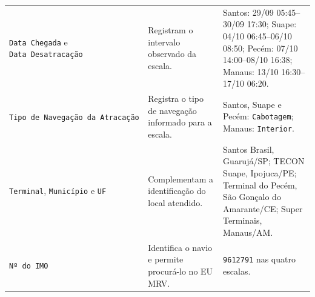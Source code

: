 \documentclass[brazil,]{article}
\begin{document}
\begin{longtable}[]{@{}lll@{}}
\begin{minipage}[t]{0.30\columnwidth}\raggedright
\texttt{Data\ Chegada} e \texttt{Data\ Desatracação}\strut
\end{minipage} & \begin{minipage}[t]{0.30\columnwidth}\raggedright
Registram o intervalo observado da escala.\strut
\end{minipage} & \begin{minipage}[t]{0.30\columnwidth}\raggedright
Santos: 29/09 05:45--30/09 17:30; Suape: 04/10 06:45--06/10 08:50;
Pecém: 07/10 14:00--08/10 16:38; Manaus: 13/10 16:30--17/10 06:20.\strut
\end{minipage}\tabularnewline
\begin{minipage}[t]{0.30\columnwidth}\raggedright
\texttt{Tipo\ de\ Navegação\ da\ Atracação}\strut
\end{minipage} & \begin{minipage}[t]{0.30\columnwidth}\raggedright
Registra o tipo de navegação informado para a escala.\strut
\end{minipage} & \begin{minipage}[t]{0.30\columnwidth}\raggedright
Santos, Suape e Pecém: \texttt{Cabotagem}; Manaus:
\texttt{Interior}.\strut
\end{minipage}\tabularnewline
\begin{minipage}[t]{0.30\columnwidth}\raggedright
\texttt{Terminal}, \texttt{Município} e \texttt{UF}\strut
\end{minipage} & \begin{minipage}[t]{0.30\columnwidth}\raggedright
Complementam a identificação do local atendido.\strut
\end{minipage} & \begin{minipage}[t]{0.30\columnwidth}\raggedright
Santos Brasil, Guarujá/SP; TECON Suape, Ipojuca/PE; Terminal do Pecém,
São Gonçalo do Amarante/CE; Super Terminais, Manaus/AM.\strut
\end{minipage}\tabularnewline
\begin{minipage}[t]{0.30\columnwidth}\raggedright
\texttt{Nº\ do\ IMO}\strut
\end{minipage} & \begin{minipage}[t]{0.30\columnwidth}\raggedright
Identifica o navio e permite procurá-lo no EU MRV.\strut
\end{minipage} & \begin{minipage}[t]{0.30\columnwidth}\raggedright
\texttt{9612791} nas quatro escalas.\strut
\end{minipage}\tabularnewline
\bottomrule
\end{longtable}
\end{document}
